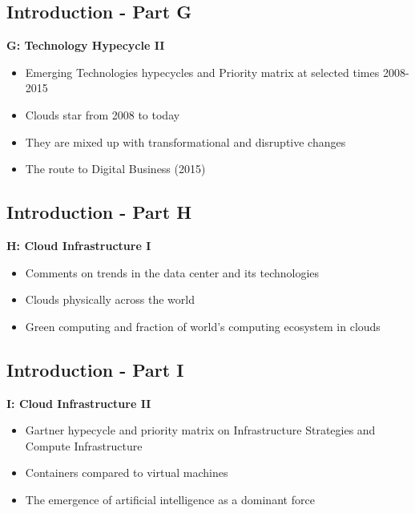 \subsection{Introduction - Part G}\label{s:cloud-fundamentals-g}

\textbf{G: Technology Hypecycle II}
\begin{itemize}
\item Emerging Technologies hypecycles and Priority matrix at selected times 2008-2015
\item Clouds star from 2008 to today
\item They are mixed up with transformational and disruptive changes
\item The route to Digital Business (2015)
\end{itemize}

\subsection{Introduction - Part H}\label{s:cloud-fundamentals-h}


\textbf{H: Cloud Infrastructure I}
\begin{itemize}
\item Comments on trends in the data center and its technologies
\item Clouds physically across the world
\item Green computing and fraction of world’s computing ecosystem in clouds
\end{itemize}

\subsection{Introduction - Part I}\label{s:cloud-fundamentals-i}

\textbf{I: Cloud Infrastructure II}
\begin{itemize}
\item Gartner hypecycle and priority matrix on Infrastructure Strategies and Compute Infrastructure
\item Containers compared to virtual machines
\item The emergence of artificial intelligence as a dominant force
\end{itemize}

